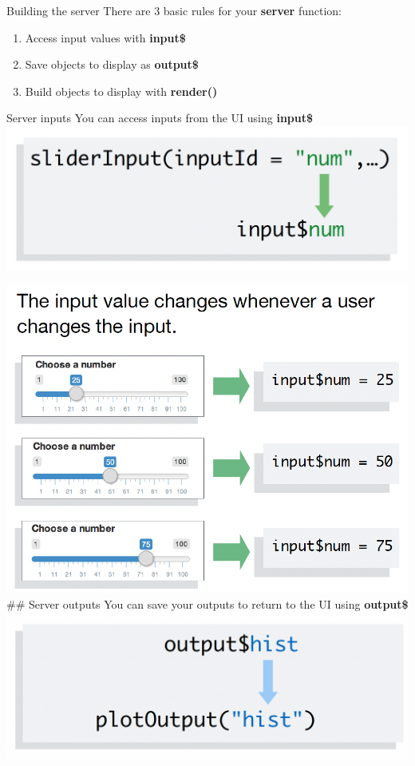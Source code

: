 \documentclass[
  ignorenonframetext,
]{beamer}
\providecommand{\tightlist}{%
  \setlength{\itemsep}{0pt}\setlength{\parskip}{0pt}}
\begin{document}
\begin{frame}{Building the server}
\label{building-the-server}
There are 3 basic rules for your \textbf{server} function:

\begin{enumerate}
\tightlist
\item
  Access input values with \textbf{input\$}
\item
  Save objects to display as \textbf{output\$}
\item
  Build objects to display with \textbf{render()}
\end{enumerate}
\end{frame}

\begin{frame}{Server inputs}
\label{server-inputs}
You can access inputs from the UI using \textbf{input\$} \center
\includegraphics{shinyfigs/shiny_server_inputs1.png}
\end{frame}

\begin{frame}{}
\label{section}
\center

\includegraphics{shinyfigs/shiny_server_inputs2.png} \#\# Server outputs
You can save your outputs to return to the UI using \textbf{output\$}
\center \includegraphics{shinyfigs/shiny_server_output1.png}
\end{frame}
\end{document}
